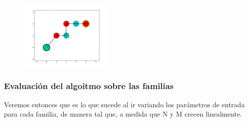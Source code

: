 \begin{figure} [!ht]
{    \includegraphics[width=0.40\textwidth]{./EJ1/fam5.jpeg}}
    \label{fig:f5}
    \label{fig:f6}
    \label{fig:f7}
    \label{fig:f8}
\end{figure}


\newpage
 
 
  \subsubsection*{Evaluación del algoitmo sobre las familias}

\indent Veremos entonces que es lo que sucede al ir variando los parámetros de entrada para cada familia, de manera tal que, a medida que N y M crecen linealmente.\\


